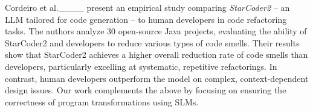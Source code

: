 Cordeiro et al.____ present an empirical study comparing \emph{StarCoder2} -- an LLM tailored for code generation -- to human developers in code refactoring tasks. The authors analyze 30 open-source Java projects, evaluating the ability of StarCoder2 and developers to reduce various types of code smells. Their results show that StarCoder2 achieves a higher overall reduction rate of code smells than developers, particularly excelling at systematic, repetitive refactorings. In contrast, human developers outperform the model on complex, context-dependent design issues.
Our work complements the above by focusing on ensuring the correctness of program transformations using SLMs.